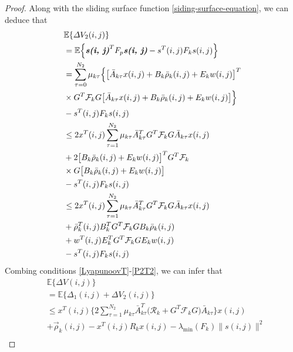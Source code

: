 \documentclass[conference]{IEEEtran}
\begin{document}
\begin{proof}
	Along with the sliding surface function \eqref{siding-surface-equation}, we can deduce that
	\begin{equation} \label{P2T2}
		\begin{split}
			&\mathbb{E}\{\varDelta V_{2}(i,j) \}\\
			&=\mathbb{E}\Big\{\emph{\textbf{s(i, j)}}^{T}F_{p}\emph{\textbf{s(i, j)}} - s^{T}(i,j)F_{k}s(i,j)\Big\}\\
			&=  \sum_{\tau =0}^{N_{2}}\mu_{k\tau }\Big\{\big[\bar{A}_{k\tau }x(i,j)+B_{k}\bar{\rho}_{k}(i,j)+E_{k}w(i,j)\big]^{T}\\
			&\times G^{T}\mathcal{F}_{k} G\big[ \bar{A}_{k\tau }x(i,j)+B_{k}\bar{\rho}_{k}(i,j)+E_{k}w(i,j)\big]\Big\}\\
			&-s^{T}(i,j)F_{k}s(i,j)\\
			&\leq 2x^{T}(i,j)\sum_{\tau =1}^{N_{2}}\mu_{k\tau }\bar{A}^{T}_{k\tau }G^{T}\mathcal{F}_{k}G\bar{A}_{k\tau }x(i,j) \\
			&+2\big[B_{k}\bar{\rho}_{k}(i,j)+E_{k}w(i,j)\big]^{T}G^{T}\mathcal{F}_{k}\\
			&\times G\big[B_{k}\bar{\rho}_{k}(i,j)+E_{k}w(i,j)\big]\\
			&-s^{T}(i,j)F_{k}s(i,j)\\
			&\leq 2x^{T}(i,j)\sum_{\tau =1}^{N_{2}}\mu_{k\tau }\bar{A}^{T}_{k\tau }G^{T}\mathcal{F}_{k}G\bar{A}_{k\tau }x(i,j) \\
			&+ \bar{\rho}^{T}_{k}(i,j)B^{T}_{k}G^{T}\mathcal{F}_{k}GB_{k}\bar{\rho}_{k}(i,j)\\
			&+w^{T}(i,j)E^{T}_{k}G^{T}\mathcal{F}_{k}GE_{k}w(i,j)\\
			&-s^{T}(i,j)F_{k}s(i,j)
		\end{split}
	\end{equation}
	Combing conditions \eqref{LyapunoovT}-\eqref{P2T2}, we can infer that 
	\begin{equation}\label{P2T3}
		\begin{split}
				&\mathbb{E}\{\varDelta V(i,j) \}\\
				&= \mathbb{E}\Big\{\varDelta_{1}(i,j)+\varDelta V_{2}(i,j) \Big\}\\
				&\leq x^{T}(i,j)\Big\{ 2\sum_{\tau =1}^{N_{2}}\mu_{k\tau }\bar{A}^{T}_{k\tau }\big(\mathcal{R}_{k} +G^{T}\mathcal{F}_{k}G\big)\bar{A}_{k\tau } \Big\} x(i,j) \\
				& +\vec{\rho}_{k}(i,j)-x^{T}(i,j)R_{k}x(i,j) - \lambda_{\mathrm{min}}(F_{k})\|s(i,j)\|^{2}\\
		\end{split}
	\end{equation}

\end{proof}
\end{document}
